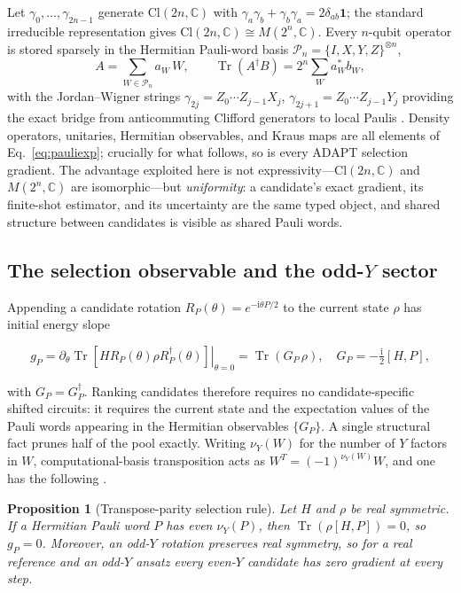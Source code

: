 \documentclass[aps,pra,reprint,superscriptaddress,nofootinbib,floatfix]{revtex4-2}
\newcommand{\Cl}{\mathrm{Cl}}
\newcommand{\C}{\mathbb{C}}
\newcommand{\Tr}{\operatorname{Tr}}
\newcommand{\ii}{\mathrm{i}}
\newcommand{\calP}{\mathcal{P}}
\newtheorem{proposition}{Proposition}
\begin{document}
Let $\gamma_0,\dots,\gamma_{2n-1}$ generate $\Cl(2n,\C)$ with $\gamma_a\gamma_b+\gamma_b\gamma_a=2\delta_{ab}\mathbf 1$; the standard irreducible representation gives $\Cl(2n,\C)\cong M(2^n,\C)$. Every $n$-qubit operator is stored sparsely in the Hermitian Pauli-word basis $\calP_n=\{I,X,Y,Z\}^{\otimes n}$,
\begin{equation}
A=\sum_{W\in\calP_n}a_W\,W,\qquad \Tr(A^\dagger B)=2^n\!\sum_W a_W^*b_W,
\label{eq:pauliexp}
\end{equation}
with the Jordan--Wigner strings $\gamma_{2j}=Z_0\cdots Z_{j-1}X_j$, $\gamma_{2j+1}=Z_0\cdots Z_{j-1}Y_j$ providing the exact bridge from anticommuting Clifford generators to local Paulis \cite{jordan1928,utama2025operatorcentric}. Density operators, unitaries, Hermitian observables, and Kraus maps are all elements of Eq.~\eqref{eq:pauliexp}; crucially for what follows, so is every ADAPT selection gradient. The advantage exploited here is not expressivity---$\Cl(2n,\C)$ and $M(2^n,\C)$ are isomorphic---but \emph{uniformity}: a candidate's exact gradient, its finite-shot estimator, and its uncertainty are the same typed object, and shared structure between candidates is visible as shared Pauli words.

\subsection{The selection observable and the odd-$Y$ sector}
\label{sec:oddy}

Appending a candidate rotation $R_P(\theta)=e^{-\ii\theta P/2}$ to the current state $\rho$ has initial energy slope
\begin{widetext}
\begin{equation}
g_P=\left.\partial_\theta \Tr\!\left[HR_P(\theta)\rho R_P^\dagger(\theta)\right]\right|_{\theta=0}=\Tr(G_P\,\rho),\quad G_P=-\tfrac{\ii}{2}[H,P],
\label{eq:gp}
\end{equation}
\end{widetext}
with $G_P=G_P^\dagger$. Ranking candidates therefore requires no candidate-specific shifted circuits: it requires the current state and the expectation values of the Pauli words appearing in the Hermitian observables $\{G_P\}$. A single structural fact prunes half of the pool exactly. Writing $\nu_Y(W)$ for the number of $Y$ factors in $W$, computational-basis transposition acts as $W^T=(-1)^{\nu_Y(W)}W$, and one has the following \cite{utama2025operatorcentric}.

\begin{proposition}[Transpose-parity selection rule]
\label{prop:oddy}
Let $H$ and $\rho$ be real symmetric. If a Hermitian Pauli word $P$ has even $\nu_Y(P)$, then $\Tr(\rho[H,P])=0$, so $g_P=0$. Moreover, an odd-$Y$ rotation preserves real symmetry, so for a real reference and an odd-$Y$ ansatz every even-$Y$ candidate has zero gradient at every step.
\end{proposition}
\end{document}
